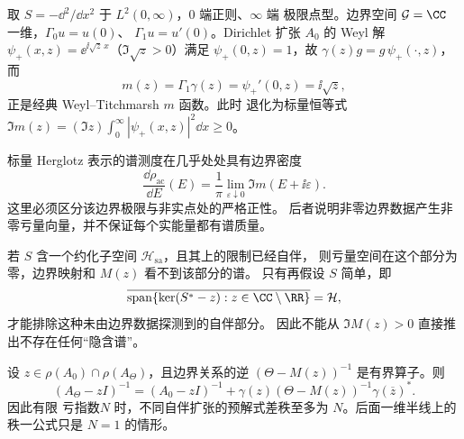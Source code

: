 \begin{example}
取 $S=-\dd^2/\dd x^2$ 于 $L^2(0,\infty)$，$0$ 端正则、$\infty$ 端
极限点型。边界空间 $\mathcal G=\CC$ 一维，$\Gamma_0u=u(0)$、
$\Gamma_1u=u'(0)$。Dirichlet 扩张 $A_0$ 的 Weyl 解
$\psi_+(x,z)=\ee^{\ii\sqrt z\,x}$（$\Im\sqrt z>0$）满足 $\psi_+(0,z)=1$，故
$\gamma(z)g=g\,\psi_+(\cdot,z)$，而
\[
 m(z)=\Gamma_1\gamma(z)=\psi_+'(0,z)=\ii\sqrt z,
\]
正是经典 Weyl--Titchmarsh $m$ 函数。此时
退化为标量恒等式 $\Im m(z)=(\Im z)\int_0^\infty|\psi_+(x,z)|^2\dd x\ge0$。
\end{example}

\begin{note}[正性能够确定哪些谱信息]
标量 Herglotz 表示的谱测度在几乎处处具有边界密度
\[
\frac{\dd\rho_{\mathrm{ac}}}{\dd E}(E)
=\frac1\pi\lim_{\varepsilon\downarrow0}\Im m(E+\ii\varepsilon).
\]
这里必须区分该边界极限与非实点处的严格正性。
后者说明非零边界数据产生非零亏量向量，并不保证每个实能量都有谱质量。

若 $S$ 含一个约化子空间 $\mathcal H_{\mathrm{sa}}$，且其上的限制已经自伴，
则亏量空间在这个部分为零，边界映射和 $M(z)$ 看不到该部分的谱。
只有再假设 $S$ 简单，即
\[
\overline{\operatorname{span}\{\ker(S^*-z):z\in\CC\setminus\RR\}}
=\mathcal H,
\]
才能排除这种未由边界数据探测到的自伴部分。
因此不能从 $\Im M(z)>0$ 直接推出不存在任何“隐含谱”。
\end{note}

\begin{theorem}
设 $z\in\rho(A_0)\cap\rho(A_\Theta)$，且边界关系的逆 $(\Theta-M(z))^{-1}$ 是有界算子。则
\begin{equation}\label{eq:math-sl-krein-resolvent-abstract}
 (A_\Theta-zI)^{-1}
 =(A_0-zI)^{-1}
 +\gamma(z)(\Theta-M(z))^{-1}\gamma(\overline z)^*.
\end{equation}
因此有限 亏指数$N$ 时，不同自伴扩张的预解式差秩至多为 $N$。后面一维半线上的秩一公式只是 $N=1$ 的情形。
\end{theorem}

